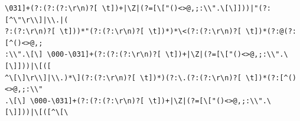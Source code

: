 \documentclass{beamer}
\begin{document}
\begin{frame}[fragile]
\begin{verbatim}
\031]+(?:(?:(?:\r\n)?[ \t])+|\Z|(?=[\["()<>@,;:\\".\[\]]))|"(?:[^\"\r\\]|\\.|(
?:(?:\r\n)?[ \t]))*"(?:(?:\r\n)?[ \t])*)*\<(?:(?:\r\n)?[ \t])*(?:@(?:[^()<>@,;
:\\".\[\] \000-\031]+(?:(?:(?:\r\n)?[ \t])+|\Z|(?=[\["()<>@,;:\\".\[\]]))|\[([
^\[\]\r\\]|\\.)*\](?:(?:\r\n)?[ \t])*)(?:\.(?:(?:\r\n)?[ \t])*(?:[^()<>@,;:\\"
.\[\] \000-\031]+(?:(?:(?:\r\n)?[ \t])+|\Z|(?=[\["()<>@,;:\\".\[\]]))|\[([^\[\
\end{verbatim}
 \endgroup
\end{frame}
\end{document}
